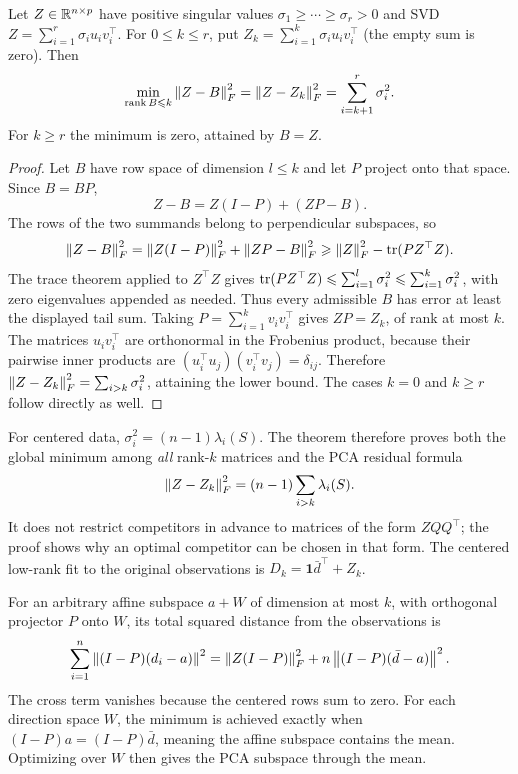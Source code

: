 \begin{theorem}\label{thm:12:lowrank}
Let $Z\in\mathbb R^{n\times p}$ have positive singular values
$\sigma_1\geqslant\cdots\geqslant\sigma_r>0$ and SVD
$Z=\sum_{i=1}^r\sigma_i u_iv_i^\top$.
For $0\leqslant k\leqslant r$, put
$Z_k=\sum_{i=1}^k\sigma_i u_iv_i^\top$ (the empty sum is zero). Then
\[
\min_{\operatorname{rank}B\leqslant k}\left\lVert Z-B\right\rVert_F^2
=\left\lVert Z-Z_k\right\rVert_F^2=\sum_{i=k+1}^r\sigma_i^2.
\]
For $k\geqslant r$ the minimum is zero, attained by $B=Z$.
\end{theorem}
\begin{proof}
Let $B$ have row space of dimension $l\leqslant k$ and let $P$ project
onto that space. Since $B=BP$,
\[
Z-B=Z(I-P)+(ZP-B).
\]
The rows of the two summands belong to perpendicular subspaces, so
\[
\left\lVert Z-B\right\rVert_F^2=\left\lVert Z(I-P)\right\rVert_F^2+\left\lVert ZP-B\right\rVert_F^2
\geqslant\left\lVert Z\right\rVert_F^2-\operatorname{tr}(PZ^\top Z).
\]
The trace theorem applied to $Z^\top Z$ gives
$\operatorname{tr}(PZ^\top Z)\leqslant\sum_{i=1}^l\sigma_i^2
\leqslant\sum_{i=1}^k\sigma_i^2$, with zero eigenvalues appended as needed.
Thus every admissible $B$ has error at least the displayed tail sum.
Taking $P=\sum_{i=1}^k v_iv_i^\top$ gives
$ZP=Z_k$, of rank at most $k$.
The matrices $u_iv_i^\top$ are orthonormal in the Frobenius product,
because their pairwise inner products are
$(u_i^\top u_j)(v_i^\top v_j)=\delta_{ij}$.
Therefore $\left\lVert Z-Z_k\right\rVert_F^2=\sum_{i>k}\sigma_i^2$, attaining the lower bound.
The cases $k=0$ and $k\geqslant r$ follow directly as well.
\end{proof}

For centered data, $\sigma_i^2=(n-1)\lambda_i(S)$.
The theorem therefore proves both the global minimum among \emph{all}
rank-$k$ matrices and the PCA residual formula
\[
\left\lVert Z-Z_k\right\rVert_F^2=(n-1)\sum_{i>k}\lambda_i(S).
\]
It does not restrict competitors in advance to matrices of the form
$ZQQ^\top$; the proof shows why an optimal competitor can be chosen in
that form. The centered low-rank fit to the original observations is
$D_k=\mathbf1\bar d^\top+Z_k$.

For an arbitrary affine subspace $a+W$ of dimension at most $k$, with
orthogonal projector $P$ onto $W$, its total squared distance from the
observations is
\[
\sum_{i=1}^n\left\lVert(I-P)(d_i-a)\right\rVert^2
=\left\lVert Z(I-P)\right\rVert_F^2+n\left\lVert(I-P)(\bar d-a)\right\rVert^2.
\]
The cross term vanishes because the centered rows sum to zero.
For each direction space $W$, the minimum is achieved exactly when
$(I-P)a=(I-P)\bar d$, meaning the affine subspace contains the mean.
Optimizing over $W$ then gives the PCA subspace through the mean.

